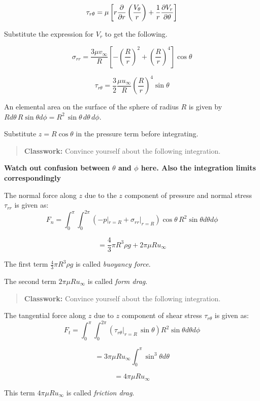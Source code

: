 $$ \tau_{r\theta} = \mu \left[ r {\partial \over \partial r} \left( V_\theta \over r \right) + {1 \over r} {\partial V_r \over \partial \theta} \right]$$


Substitute the expression for $V_r$ to get the following.

$$\sigma_{rr} = \frac{3\mu v_\infty}{R} \left[ -\left(\frac{R}{r}\right)^2 +
\left(\frac{R}{r}\right)^4 \right] \cos\theta$$ 


$$\tau_{r\theta} = \frac{3}{2} \frac{\mu u_\infty}{R} \left(\frac{R}{r}\right)^4
\sin\theta$$ 


An elemental area on the surface of the sphere of radius $R$ is given by $Rd\theta \, R\sin\theta d\phi = R^2 \,\sin\theta \, d\theta \, d\phi$.


Substitute $z = R \cos\theta$ in the pressure term before integrating.


\begin{quote}
{\bf Classwork:} Convince yourself about the following integration.
\end{quote}

{\bf Watch out confusion between $\theta$ and $\phi$ here. Also the integration limits correspondingly}

The normal force along $z$ due to the $z$ component of pressure and normal
stress $\tau_{rr}$ is given as:
$$ F_n = \int_{0}^{\pi}{ \int_{0}^{2\pi}{ \left( - p|_{r=R} +
\sigma_{rr}|_{r=R}\right) \cos\theta \, R^2 \sin\theta d\theta d\phi}} $$ 

$$ = \frac{4}{3} \pi R^3 \rho g + 2 \pi \mu R u_\infty $$

The first term $\frac{4}{3} \pi R^3 \rho g$ is called \textit{buoyancy force}.


The second term $2 \pi \mu R u_\infty$ is called \textit{form drag}. 

\begin{quote}
{\bf Classwork:} Convince yourself about the following integration.
\end{quote}


The tangential force along $z$ due to  $z$ component of shear stress
$\tau_{r\theta}$ is given as:
$$ F_t = \int_{0}^{\pi}{ \int_{0}^{2\pi}{ \left( \tau_{r\theta}|_{r=R} \, \sin\theta \right) R^2
\sin\theta d\theta d\phi}} $$ 

$$ = 3 \pi \mu R u_\infty \int_{0}^{\pi}{\sin^3\theta d\theta} $$

$$ = 4 \pi \mu R u_\infty$$

This term $4 \pi \mu R u_\infty$ is called \textit{friction drag}. 

